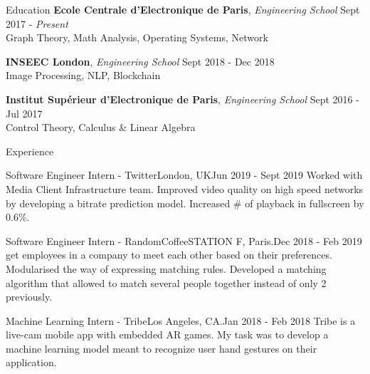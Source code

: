 \documentclass{resume} %
\begin{document}
	\begin{rSection}{Education}
		{\bf Ecole Centrale d'Electronique de Paris}, {\em Engineering School} \hfill {Sept 2017 - \em Present}
		\\ Graph Theory, Math Analysis, Operating Systems, Network

		{\bf INSEEC London}, {\em Engineering School} \hfill {Sept 2018 - Dec 2018}
		\\ Image Processing, NLP, Blockchain

		{\bf Institut Supérieur d'Electronique de Paris}, {\em Engineering School} \hfill {Sept 2016 - Jul 2017}
		\\ Control Theory, Calculus \& Linear Algebra
	\end{rSection}

	\begin{rSection}{Experience}
		\begin{event}{Software Engineer Intern - Twitter}{London, UK}{Jun 2019 - Sept 2019}{
			Worked with Media Client Infrastructure team. Improved video quality on high speed networks by developing a bitrate prediction model. Increased \# of playback in fullscreen by 0.6\%.
		}
		\end{event}

		\begin{event}{Software Engineer Intern - RandomCoffee}{STATION F, Paris.}{Dec 2018 - Feb 2019}{
			 get employees in a company to meet each other based on their preferences. Modularised the way of expressing matching rules. Developed a matching algorithm that allowed to match several people together instead of only 2 previously.
		}
		\end{event}

		\begin{event}{Machine Learning Intern - Tribe}{Los Angeles, CA.}{Jan 2018 - Feb 2018}{
			Tribe is a live-cam mobile app with embedded AR games. My task was to develop a machine learning model meant to recognize user hand gestures on their application.
		}
		\end{event}
	\end{rSection}
\end{document}
